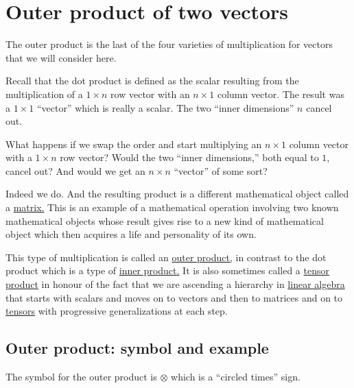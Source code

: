 \documentclass[
  a4paper,
]{article}
\begin{document}
\hypertarget{outer-product-of-two-vectors}{%
\section{Outer product of two
vectors}\label{outer-product-of-two-vectors}}

The outer product is the last of the four varieties of multiplication
for vectors that we will consider here.

Recall that the dot product is defined as the scalar resulting from the
multiplication of a \(1\times n\) row vector with an \(n \times 1\)
column vector. The result was a \(1 \times 1\) ``vector'' which is
really a scalar. The two ``inner dimensions'' \(n\) cancel out.

What happens if we swap the order and start multiplying an
\(n \times 1\) column vector with a \(1\times n\) row vector? Would the
two ``inner dimensions,'' both equal to \(1\), cancel out? And would we
get an \(n \times n\) ``vector'' of some sort?

Indeed we do. And the resulting product is a different mathematical
object called a
\href{http://en.wikipedia.org/wiki/Matrix_\%28mathematics\%29}{matrix.}
This is an example of a mathematical operation involving two known
mathematical objects whose result gives rise to a new kind of
mathematical object which then acquires a life and personality of its
own.

This type of multiplication is called an
\href{http://en.wikipedia.org/wiki/Outer_product}{outer product,} in
contrast to the dot product which is a type of
\href{http://planetmath.org/encyclopedia/InnerProduct.html}{inner
product.} It is also sometimes called a
\href{http://en.wikipedia.org/wiki/Tensor_product}{tensor product} in
honour of the fact that we are ascending a hierarchy in
\href{http://en.wikipedia.org/wiki/Linear_algebra}{linear algebra} that
starts with scalars and moves on to vectors and then to matrices and on
to
\href{http://en.wikipedia.org/wiki/Tensor_\%28intrinsic_definition\%29}{tensors}
with progressive generalizations at each step.

\hypertarget{outer-product-symbol-and-example}{%
\subsection{Outer product: symbol and
example}\label{outer-product-symbol-and-example}}

The symbol for the outer product is \(\otimes\) which is a ``circled
times'' sign.
\end{document}
